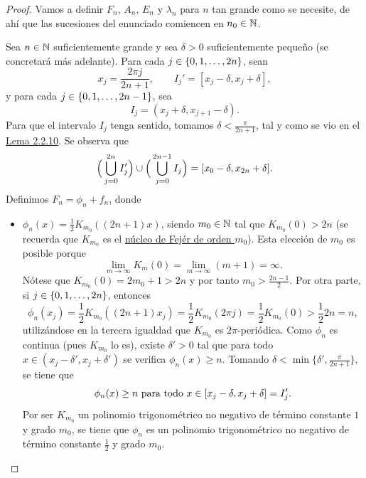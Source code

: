 \documentclass[a4paper, 12pt, oneside]{book}
\begin{document}
\begin{proof}
    Vamos a definir $F_n$, $A_n$, $E_n$ y $\lambda_n$ para $n$ tan grande como se necesite, de ahí que las sucesiones del enunciado comiencen en $n_0\in\mathbb N$.
    
    Sea $n \in \mathbb N$ suficientemente grande y sea $\delta > 0$ suficientemente pequeño (se concretará más adelante). Para cada $j \in \{0,1,\mathellipsis,2n\}$, sean
    \[x_j = \frac{2\pi j}{2n+1}, \qquad I_j' = [x_j-\delta,x_j+\delta],\]
    y para cada $j \in \{0,1,\mathellipsis,2n-1\}$, sea
    \[I_j = (x_j+\delta, x_{j+1}-\delta).\]
    Para que el intervalo $I_j$ tenga sentido, tomamos $\delta < \frac{\pi}{2n+1}$, tal y como se vio en el \hyperref[2.2.10]{\color{blue}Lema 2.2.10}. Se observa que
    \[\Bigl(\,\bigcup_{j=0}^{2n}I_j'\Bigr) \cup\Bigl(\,\bigcup_{j=0}^{2n-1}I_j\Bigr) = [x_0-\delta,x_{2n}+\delta].\]
    Definimos $F_n = \phi_n+f_n$, donde
    \begin{itemize}
        \item $\phi_n(x) = \frac{1}{2}K_{m_0}((2n+1)x)$, siendo $m_0 \in \mathbb N$ tal que $K_{m_0}(0) > 2n$ (se recuerda que $K_{m_0}$ es el \hyperref[1.2.5]{\color{blue}núcleo de Fejér de orden $m_0$}). Esta elección de $m_0$ es posible porque \[\lim_{m \to \infty} K_m(0) = \lim_{m \to \infty} (m+1) = \infty.\]
        Nótese que $K_{m_0}(0)=2m_0+1 > 2n$ y por tanto $m_0 > \frac{2n-1}{2}$. Por otra parte, si $j \in \{0,1,\mathellipsis,2n\}$, entonces
        \[\phi_n(x_j) = \frac{1}{2}K_{m_0}((2n+1)x_j) = \frac{1}{2}K_{m_0}(2\pi j) = \frac{1}{2}K_{m_0}(0) > \frac{1}{2}2n = n,\] 
        utilizándose en la tercera igualdad que $K_{m_0}$ es $2\pi$-periódica. Como $\phi_n$ es continua (pues $K_{m_0}$ lo es), existe $\delta' > 0$ tal que para todo $x \in (x_j-\delta',x_j+\delta')$ se verifica $\phi_n(x) \geq n$. Tomando $\delta < \min\{\delta',\frac{\pi}{2n+1}\}$, se tiene que
        \begin{equation}\label{2.2.14}
            \phi_n(x) \geq n \textup{ para todo } x \in [x_j-\delta,x_j+\delta] = I_j'.
        \end{equation}
        Por ser $K_{m_0}$ un polinomio trigonométrico no negativo de término constante $1$ y grado $m_0$, se tiene que $\phi_n$ es un polinomio trigonométrico no negativo de término constante $\frac{1}{2}$ y grado $m_0$. 
        

\end{itemize}
\end{proof}
\end{document}
